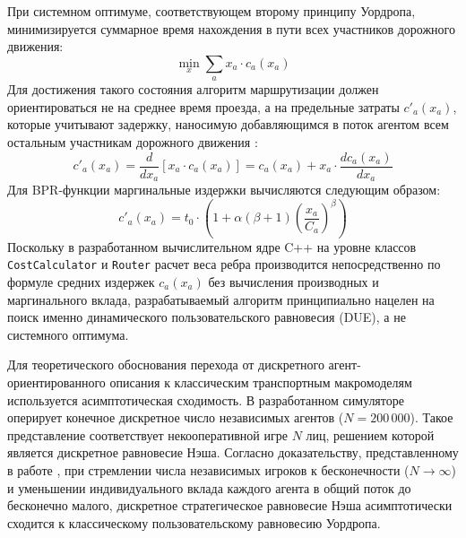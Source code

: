 При системном оптимуме, соответствующем второму принципу Уордропа, минимизируется суммарное время нахождения в пути всех участников дорожного движения:
\begin{equation}
    \min_{x} \sum_{a} x_a \cdot c_a(x_a)
\end{equation}
Для достижения такого состояния алгоритм маршрутизации должен ориентироваться не на среднее время проезда, а на предельные затраты $c'_a(x_a)$, которые учитывают задержку, наносимую добавляющимся в поток агентом всем остальным участникам дорожного движения \cite{sheffi1985urban}:
\begin{equation}
    c'_a(x_a) = \frac{d}{dx_a} [x_a \cdot c_a(x_a)] = c_a(x_a) + x_a \cdot \frac{dc_a(x_a)}{dx_a}
\end{equation}
Для BPR-функции маргинальные издержки вычисляются следующим образом:
\begin{equation}
    c'_a(x_a) = t_0 \cdot \left( 1 + \alpha(\beta + 1) \left(\frac{x_a}{C_a}\right)^\beta \right)
\end{equation}
Поскольку в разработанном вычислительном ядре C++ на уровне классов \texttt{CostCalculator} и \texttt{Router} расчет веса ребра производится непосредственно по формуле средних издержек $c_a(x_a)$ без вычисления производных и маргинального вклада, разрабатываемый алгоритм принципиально нацелен на поиск именно динамического пользовательского равновесия (DUE), а не системного оптимума.

Для теоретического обоснования перехода от дискретного агент-ориентированного описания к классическим транспортным макромоделям используется асимптотическая сходимость. В разработанном симуляторе оперирует конечное дискретное число независимых агентов ($N = 200\,000$). Такое представление соответствует некооперативной игре $N$ лиц, решением которой является дискретное равновесие Нэша. Согласно доказательству, представленному в работе \cite{haurie1985relationship}, при стремлении числа независимых игроков к бесконечности ($N \to \infty$) и уменьшении индивидуального вклада каждого агента в общий поток до бесконечно малого, дискретное стратегическое равновесие Нэша асимптотически сходится к классическому пользовательскому равновесию Уордропа.

